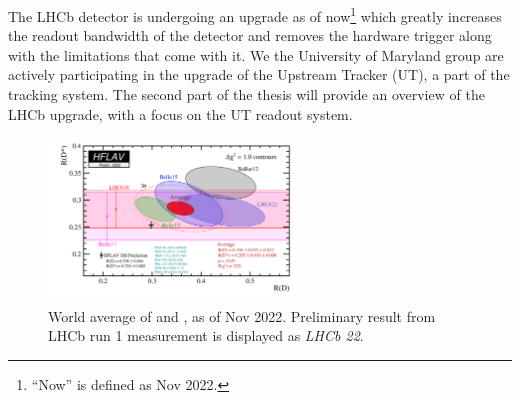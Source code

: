 The LHCb detector is undergoing an upgrade as of now\footnote{
    ``Now'' is defined as Nov 2022.
} which greatly increases
the readout bandwidth of the detector and removes the hardware trigger along
with the limitations that come with it.
We the University of Maryland group are actively participating in the upgrade
of the Upstream Tracker (UT), a part of the tracking system.
The second part of the thesis will provide an overview of the LHCb upgrade, with
a focus on the UT readout system.

\begin{figure}[htb]
    \centering
    \includegraphics[width=0.6\textwidth]{./figs-intro/hflav_2022_preliminary.png}
    \caption{
        World average of \RD and \RDst, as of Nov 2022.
        Preliminary result from LHCb run 1 measurement is displayed as
        \emph{LHCb 22}.
    }
    \label{fig:hflav}
\end{figure}
